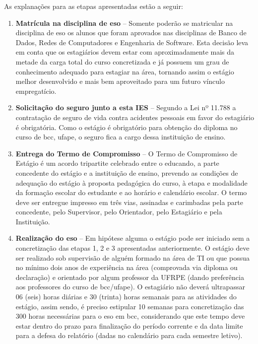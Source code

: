 \documentclass[
	12pt,				%
	openright,			%
  oneside,     %
	a4paper,			%
 hyphens,
	chapter=TITLE,		%
	english,			%
	french,				%
	spanish,			%
	brazil				%
	]{abntex2}
\begin{document}
As explanações para as etapas apresentadas estão a seguir:

\begin{enumerate}
    \item \textbf{Matrícula na disciplina de \acrshort{eso}} – Somente poderão se matricular na disciplina de \acrshort{eso} os alunos que foram aprovados nas disciplinas de Banco de Dados, Redes de Computadores e Engenharia de Software. Esta decisão leva em conta que os estagiários devem estar com aproximadamente mais da metade da carga total do curso concretizada e já possuem um grau de conhecimento adequado para estagiar na área, tornando assim o estágio melhor desenvolvido e mais bem aproveitado para um futuro vínculo empregatício.
    \item \textbf{Solicitação do seguro junto a esta IES} – Segundo a Lei nº 11.788 a contratação de seguro de vida contra acidentes pessoais em favor do estagiário é obrigatória. Como o estágio é obrigatório para obtenção do diploma no curso de \acrshort{bcc}, \acrshort{ufape}, o seguro fica a cargo dessa instituição de ensino.
    \item \textbf{Entrega do Termo de Compromisso} – O Termo de Compromisso de Estágio é um acordo tripartite celebrado entre o educando, a parte concedente do estágio e a instituição de ensino, prevendo as condições de adequação do estágio à proposta pedagógica do  curso, à etapa e modalidade da formação escolar  do  estudante  e ao horário e calendário escolar. O termo deve ser entregue impresso em três vias, assinadas e carimbadas pela parte concedente, pelo  Supervisor,  pelo  Orientador, pelo Estagiário e pela Instituição.
    \item \textbf{Realização do \acrshort{eso}} – Em hipótese alguma o estágio pode ser iniciado sem a concretização das etapas 1, 2 e 3 apresentadas anteriormente. O estágio deve ser realizado sob supervisão de alguém formado na área de TI ou que possua no mínimo dois anos de experiência na área (comprovada via diploma ou declaração) e orientado por algum professor da UFRPE (dando preferência aos professores do curso de \acrshort{bcc}/\acrshort{ufape}). O estagiário não deverá ultrapassar 06 (seis) horas diárias e 30 (trinta) horas semanais para as atividades do estágio, assim sendo, é preciso estipular 10 semanas para concretização das 300 horas necessárias para o \acrshort{eso} em \acrshort{bcc}, considerando que este tempo deve estar dentro do prazo para finalização do período corrente e da data limite para a defesa do relatório (dadas no calendário para cada semestre letivo).

\end{enumerate}
\end{document}
